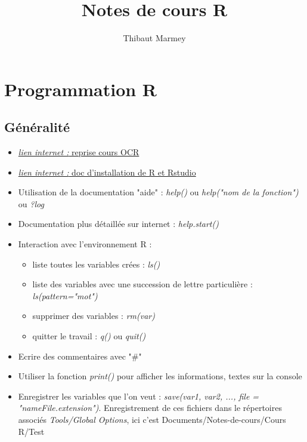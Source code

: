 \documentclass[12pt,a4paper]{article}
\author{Thibaut Marmey}
\title{Notes de cours R}
\begin{document}
	\maketitle

\begin{normalsize}
\tableofcontents
\end{normalsize}

\section{Programmation R}
\subsection{Généralité}
\begin{itemize}
\item \href{https://openclassrooms.com/fr/courses/1393696-effectuez-vos-etudes-statistiques-avec-r/1394570-les-facteurs#/id/r-1395598}{\textit{lien internet : }reprise cours OCR}
\item \href{https://linuxconfig.org/rstudio-on-ubuntu-18-04-bionic-beaver-linux}{\textit{lien internet : }doc d'installation de R et Rstudio}
\item Utilisation de la documentation "aide" : \textit{help()} ou \textit{help("nom de la fonction")} ou  \textit{?log}
\item Documentation plus détaillée sur internet : \textit{help.start()}
\item Interaction avec l'environnement R :
\begin{itemize}
\item liste toutes les variables crées : \textit{ls()}
\item liste des variables avec une succession de lettre particulière : \textit{ls(pattern="mot")}
\item supprimer des variables : \textit{rm(var)}
\item quitter le travail : \textit{q()} ou \textit{quit()}
\end{itemize}
\item Ecrire des commentaires avec "\#"
\item Utiliser la fonction \textit{print()} pour afficher les informations, textes sur la console
\item Enregistrer les variables que l'on veut : 
\newline \textit{save(var1, var2, ..., file = "nameFile.extension")}.
\newline Enregistrement de ces fichiers dans le répertoires associés \textit{Tools/Global Options}, ici c'est Documents/Notes-de-cours/Cours R/Test
\end{itemize}
\end{document}
